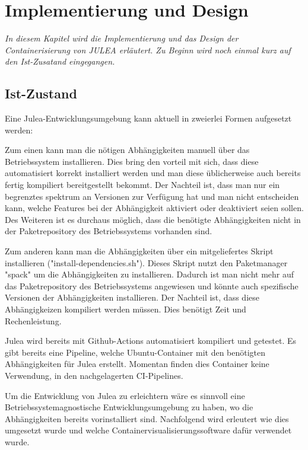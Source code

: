 \chapter{Implementierung und Design}
\label{cha:implementation_design}

\textit{In diesem Kapitel wird die Implementierung und das Design der Containerisierung von JULEA erläutert. Zu Beginn wird noch einmal kurz auf den Ist-Zusatand eingegangen.}

\section{Ist-Zustand}

Eine Julea-Entwicklungsumgebung kann aktuell in zweierlei Formen aufgesetzt werden:

Zum einen kann man die nötigen Abhängigkeiten manuell über das Betriebssystem installieren. Dies bring den vorteil mit sich, dass diese automatisiert korrekt installiert werden und man diese üblicherweise auch bereits fertig kompiliert bereitgestellt bekommt. Der Nachteil ist, dass man nur ein begrenztes spektrum an Versionen zur Verfügung hat und man nicht entscheiden kann, welche Features bei der Abhängigkeit aktiviert oder deaktiviert seien sollen. Des Weiteren ist es durchaus möglich, dass die benötigte Abhängigkeiten nicht in der Paketrepository des Betriebssystems vorhanden sind. 

Zum anderen kann man die Abhängigkeiten über ein mitgeliefertes Skript installieren ("install-dependencies.sh"). Dieses Skript nutzt den Paketmanager "spack" um die Abhängigkeiten zu installieren. Dadurch ist man nicht mehr auf das Paketrepository des Betriebssystems angewiesen und könnte auch spezifische Versionen der Abhängigkeiten installieren. Der Nachteil ist, dass diese Abhängigkeizen kompiliert werden müssen. Dies benötigt Zeit und Rechenleistung. 

Julea wird bereits mit Github-Actions automatisiert kompiliert und getestet. Es gibt bereits eine Pipeline, welche Ubuntu-Container mit den benötigten Abhängigkeiten für Julea erstellt. Momentan finden dies Container keine Verwendung, in den nachgelagerten CI-Pipelines. 


Um die Entwicklung von Julea zu erleichtern wäre es sinnvoll eine Betriebssystemagnostische Entwicklungsumgebung zu haben, wo die Abhängigkeiten bereits vorinstalliert sind. Nachfolgend wird erleutert wie dies umgesetzt wurde und welche Containervisualisierungssoftware dafür verwendet wurde.


